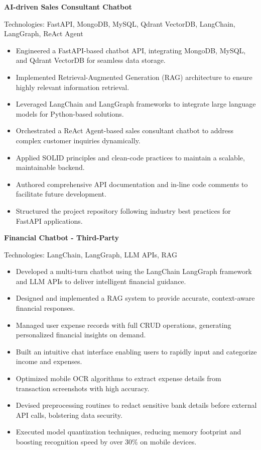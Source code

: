 \documentclass[letterpaper, 11pt]{article}
\newcommand{\sectiontitle}[1]{\vspace{0.1in}\noindent{\Large\color{primary} #1}\vspace{0.05in}\hrulefill}
\newcommand{\entry}[4]{
    \vspace{0.02in}
    \noindent\textbf{#1}
    \hfill
    #2
    \newline
    \textit{#3}
    \newline
    #4
}
\begin{document}
\sectiontitle{Projects}
\entry{AI-driven Sales Consultant Chatbot}{}{}{Technologies: FastAPI, MongoDB, MySQL, Qdrant VectorDB, LangChain, LangGraph, ReAct Agent}
\begin{itemize}[leftmargin=0.2in]
    \item Engineered a FastAPI-based chatbot API, integrating MongoDB, MySQL, and Qdrant VectorDB for seamless data storage.
    \item Implemented Retrieval-Augmented Generation (RAG) architecture to ensure highly relevant information retrieval.
    \item Leveraged LangChain and LangGraph frameworks to integrate large language models for Python-based solutions.
    \item Orchestrated a ReAct Agent-based sales consultant chatbot to address complex customer inquiries dynamically.
    \item Applied SOLID principles and clean-code practices to maintain a scalable, maintainable backend.
    \item Authored comprehensive API documentation and in-line code comments to facilitate future development.
    \item Structured the project repository following industry best practices for FastAPI applications.
\end{itemize}

\entry{Financial Chatbot - Third-Party}{}{}{Technologies: LangChain, LangGraph, LLM APIs, RAG}
\begin{itemize}[leftmargin=0.2in]
    \item Developed a multi-turn chatbot using the LangChain LangGraph framework and LLM APIs to deliver intelligent financial guidance.
    \item Designed and implemented a RAG system to provide accurate, context-aware financial responses.
    \item Managed user expense records with full CRUD operations, generating personalized financial insights on demand.
    \item Built an intuitive chat interface enabling users to rapidly input and categorize income and expenses.
    \item Optimized mobile OCR algorithms to extract expense details from transaction screenshots with high accuracy.
    \item Devised preprocessing routines to redact sensitive bank details before external API calls, bolstering data security.
    \item Executed model quantization techniques, reducing memory footprint and boosting recognition speed by over 30\% on mobile devices.
\end{itemize}
\end{document}

